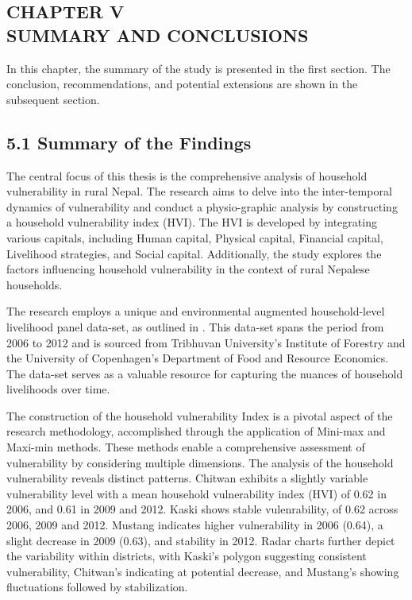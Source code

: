 \clearpage
\begin{center}
	\section*{\large{CHAPTER V \\ \vspace{-0.3cm} SUMMARY AND CONCLUSIONS}}
\end{center}
\renewcommand{\thepage}{\arabic{page}}
In this chapter, the summary of the study is presented in the first section. The conclusion, recommendations, and potential extensions are shown in the subsequent
section. \\
\subsection*{5.1 Summary of the Findings}
\renewcommand{\thepage}{\arabic{page}}
The central focus of this thesis is the comprehensive analysis of household vulnerability in rural Nepal. The research aims to delve into the inter-temporal dynamics of vulnerability and conduct a physio-graphic analysis by constructing a household vulnerability index (HVI). The HVI is developed by integrating various capitals, including Human capital, Physical capital, Financial capital, Livelihood strategies, and Social capital. Additionally, the study explores the factors influencing household vulnerability in the context of rural Nepalese households.

The research employs a unique and environmental augmented household-level livelihood panel data-set, as outlined in \citep{walelign2022unique}. This data-set spans the period from 2006 to 2012 and is sourced from Tribhuvan University’s Institute of Forestry and the University of Copenhagen’s Department of Food and Resource Economics. The data-set serves as a valuable resource for capturing the nuances of household livelihoods over time. 

The construction of the household vulnerability Index is a pivotal aspect of the research methodology, accomplished through the application of Mini-max and Maxi-min methods. These methods enable a comprehensive assessment of vulnerability by considering multiple dimensions. The analysis of the household vulnerability reveals distinct patterns. Chitwan exhibits a slightly variable vulnerability level with a mean household vulnerability index (HVI) of 0.62 in 2006, and 0.61 in 2009 and 2012. Kaski shows stable vulenrability, of 0.62 across 2006, 2009 and 2012. Mustang indicates higher vulnerability in 2006 (0.64), a slight decrease in 2009 (0.63), and stability in 2012.  Radar charts further depict the variability within districts, with Kaski's polygon suggesting consistent vulnerability, Chitwan's indicating at potential decrease, and Mustang's showing fluctuations followed by stabilization.  

